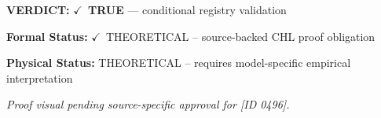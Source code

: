 \textbf{VERDICT:} \ensuremath{\checkmark}\ \textbf{TRUE} --- conditional registry validation

\textbf{Formal Status:} \ensuremath{\checkmark}\ THEORETICAL -- source-backed CHL proof obligation

\textbf{Physical Status:} THEORETICAL -- requires model-specific empirical interpretation
\par\vspace{0.45em}
\par
\vfill
\begingroup\footnotesize\itshape
Proof visual pending source-specific approval for [ID 0496].
\par\endgroup
\vfill
\endgroup
\endgroup
